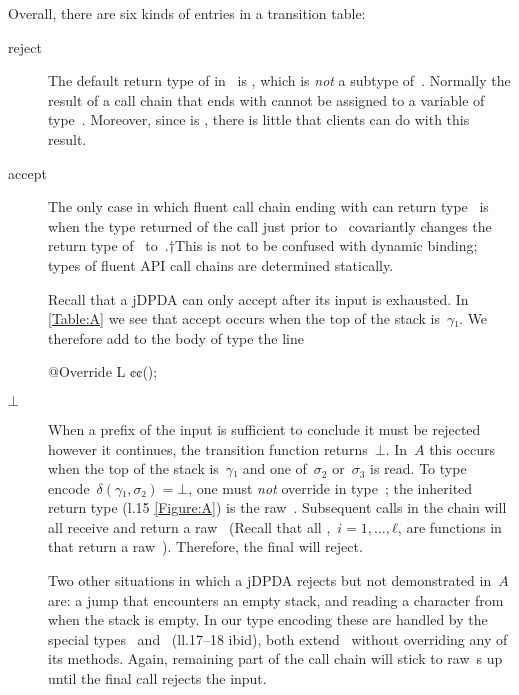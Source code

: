 \documentclass[a4paper,USenglish]{lipics-v2016}
\makeatletter
\newcommand\kk[1]{\textcolor{RoyalBlue}{\text{\textup{\textbf{\texttt{#1}}}}}}
\newcommand\cc[1]{\textcolor{Sepia}{\text{\textup{\textbf{\texttt{#1}}}}}}
\newcommand\gobble[1]{\@gobble{#1}}
\numberwithin{equation}{section}
\numberwithin{figure}{section}
\makeatother
\begin{document}
Overall, there are six kinds of entries in a transition table:
\begin{description}

  \item[\textsf{reject}]
  The default return type of \cc{\$()} in~\cc{C} is \cc{$ΣΣ$}, which
  is \emph{not} a subtype of~\cc{L}. Normally the result of a call chain that ends with \cc{\$()}
  cannot be assigned to a variable of type~\cc{L}. Moreover, since \cc{$ΣΣ$} is \kk{private},
  there is little that clients can do with this result.

  \item[\textsf{accept}]
  The only case in which fluent call chain ending with \cc{\$()} can return
    type~\cc{L} is when the type returned of the call just prior to~\cc{.\$()} covariantly
    changes the return type of~\cc{\$()} to~\cc{L}.†{This is not to be confused with dynamic binding;
    types of fluent API call chains are determined statically.}
  \par
  Recall that a jDPDA can only accept after its input is exhausted.
  In \cref{Table:A} we see that \textsf{accept} occurs when the top of the stack is~$\gamma₁$.
  We therefore add to the body of type \cc{C$\gamma$1} the line
  \begin{JAVA}
@Override L ¢\gobble$¢$();
  \end{JAVA}

  \item[$⊥$]
  When a prefix of the input is sufficient to conclude it must be rejected however it continues,
    the transition function returns~$⊥$.
  In~$A$ this occurs when the top of the stack is~$\gamma₁$ and one of~$σ_2$ or~$σ_3$ is read.
  To type encode~$δ(\gamma₁,σ₂) =⊥$, one must \emph{not} override \cc{$σ$2()} in type~\cc{C$\gamma$1};
    the inherited return type (l.15 \cref{Figure:A}) is the raw~\cc{C}.
  Subsequent calls in the chain will all receive and return a raw~\cc{C}
    (Recall that all \cc{$σ${}$i$()},~$i=1,…,ℓ$, are functions in~\cc{C} that return a raw~\cc{C}).
  Therefore, the final \cc{\$()} will reject.
  \par
  Two other situations in which a jDPDA rejects but not demonstrated in~$A$ are:
    a \textsf{jump} that encounters an empty stack, and reading a character from when the stack is empty.
  In our type encoding these are handled by the special
    types~\cc{E} and~\cc{\textcurrency} (ll.17--18 ibid), both extend~\cc{C} without
    overriding any of its methods. Again, remaining part of the call chain will stick to
    raw~\cc{C}s up until the final \cc{\$()} call rejects the input.


\end{description}
\end{document}
